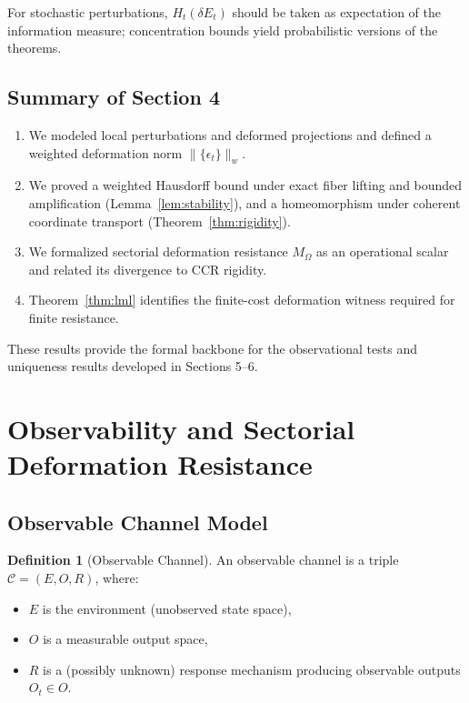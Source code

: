 \documentclass[11pt,a4paper]{article}
\theoremstyle{plain}
\theoremstyle{definition}
\newtheorem{definition}[theorem]{Definition}
\theoremstyle{remark}
\begin{document}
For stochastic perturbations, $H_t(\delta E_t)$ should be taken as expectation of the information measure; concentration bounds yield probabilistic versions of the theorems.

\subsection{Summary of Section 4}

\begin{enumerate}[leftmargin=*]
    \item We modeled local perturbations and deformed projections and defined a weighted deformation norm $\|\{\epsilon_t\}\|_w$.
    \item We proved a weighted Hausdorff bound under exact fiber lifting and bounded amplification (Lemma~\ref{lem:stability}), and a homeomorphism under coherent coordinate transport (Theorem~\ref{thm:rigidity}).
    \item We formalized sectorial deformation resistance $M_\Omega$ as an operational scalar and related its divergence to CCR rigidity.
    \item Theorem~\ref{thm:lml} identifies the finite-cost deformation witness required for finite resistance.
\end{enumerate}

These results provide the formal backbone for the observational tests and uniqueness results developed in Sections 5--6.

\section{Observability and Sectorial Deformation Resistance}

\subsection{Observable Channel Model}

\begin{definition}[Observable Channel]
An observable channel is a triple $\mathcal{C} = (E, O, R)$, where:
\begin{itemize}[leftmargin=*]
    \item $E$ is the environment (unobserved state space),
    \item $O$ is a measurable output space,
    \item $R$ is a (possibly unknown) response mechanism producing observable outputs $O_t \in O$.
\end{itemize}
\end{definition}
\end{document}
